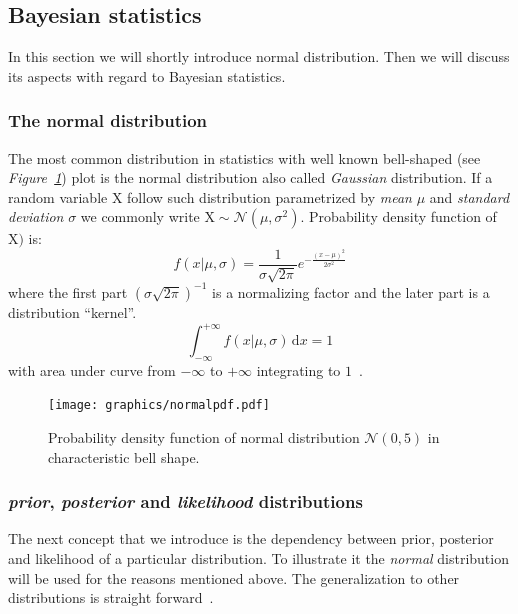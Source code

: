 \documentclass[12pt, a4paper, pdflatex, leqno]{report}
\begin{document}
\subsection{Bayesian statistics\label{sec:bayesian}}
In this section we will shortly introduce normal distribution. Then we will discuss its aspects with regard to Bayesian statistics.

\subsubsection{The normal distribution}
The most common distribution in statistics with well known bell-shaped (see \emph{Figure~\ref{fig:normaldist}}) plot is the normal distribution also called \emph{Gaussian} distribution. If a random variable $\mathrm{X}$ follow such distribution parametrized by \emph{mean} $\mu$ and \emph{standard deviation} $\sigma$ we commonly write $\mathrm{X} \sim \mathcal{N}\left( \mu, \sigma^2 \right)$. Probability density function of $\mathrm{X})$ is:
$$
f \left(x | \mu, \sigma \right) = \frac{1}{\sigma \sqrt{2 \pi }} e^{- \frac{ {\left (  x - \mu \right )}^2 }{2 \sigma^2} }
$$
where the first part ${\left( \sigma \sqrt{2 \pi } \right)}^{-1}$ is a normalizing factor and the later part is a distribution ``kernel''.
$$
\int_{-\infty}^{+\infty} \! f \left(x | \mu, \sigma \right) \, \mathrm{d}x = 1
$$
with area under curve from $-\infty$ to $+\infty$ integrating to $1$~\citep{rice1995mathematical}.


\begin{figure}[htbp]
\centering
\texttt{[image: graphics/normalpdf.pdf]}
\begin{tiny}
\caption{Probability density function of normal distribution $\mathcal{N}\left( 0, 5 \right)$ in characteristic bell shape.\label{fig:normaldist}}
\end{tiny}
\vspace{1cm}
\end{figure}



\subsubsection{\emph{prior}, \emph{posterior} and \emph{likelihood} distributions}
The next concept that we introduce is the dependency between prior, posterior and likelihood of a particular distribution. To illustrate it the \emph{normal} distribution will be used for the reasons mentioned above. The generalization to other distributions is straight forward~\citep{gelman2003bayesian}.\\
\end{document}
